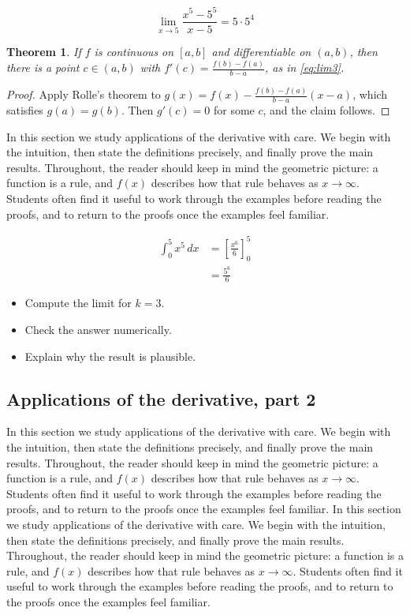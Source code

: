 \documentclass[11pt]{article}
\newtheorem{theorem}{Theorem}[section]
\begin{document}
\begin{equation}
  \lim_{x \to 5} \frac{x^{5} - 5^{5}}{x - 5} = 5 \cdot 5^{4}
  \label{eq:lim3}
\end{equation}

\begin{theorem}
If $f$ is continuous on $[a,b]$ and differentiable on $(a,b)$, then there is a point $c \in (a,b)$ with $f'(c) = \frac{f(b)-f(a)}{b-a}$, as in \eqref{eq:lim3}.
\end{theorem}

\begin{proof}
Apply Rolle's theorem to $g(x) = f(x) - \frac{f(b)-f(a)}{b-a}(x-a)$, which satisfies $g(a) = g(b)$. Then $g'(c) = 0$ for some $c$, and the claim follows.
\end{proof}

In this section we study applications of the derivative with care. We begin with the intuition, then state the definitions precisely, and finally prove the main results. Throughout, the reader should keep in mind the geometric picture: a function is a rule, and $f(x)$ describes how that rule behaves as $x \to \infty$. Students often find it useful to work through the examples before reading the proofs, and to return to the proofs once the examples feel familiar. 

\begin{align}
  \int_0^{5} x^{5}\,dx &= \left[ \frac{x^{6}}{6} \right]_0^{5} \\
  &= \frac{5^{6}}{6} \label{eq:int3}
\end{align}

\begin{itemize}
  \item Compute the limit for $k = 3$.
  \item Check the answer numerically.
  \item Explain why the result is plausible.
\end{itemize}

\subsection{Applications of the derivative, part 2}

In this section we study applications of the derivative with care. We begin with the intuition, then state the definitions precisely, and finally prove the main results. Throughout, the reader should keep in mind the geometric picture: a function is a rule, and $f(x)$ describes how that rule behaves as $x \to \infty$. Students often find it useful to work through the examples before reading the proofs, and to return to the proofs once the examples feel familiar. In this section we study applications of the derivative with care. We begin with the intuition, then state the definitions precisely, and finally prove the main results. Throughout, the reader should keep in mind the geometric picture: a function is a rule, and $f(x)$ describes how that rule behaves as $x \to \infty$. Students often find it useful to work through the examples before reading the proofs, and to return to the proofs once the examples feel familiar. 
\end{document}

